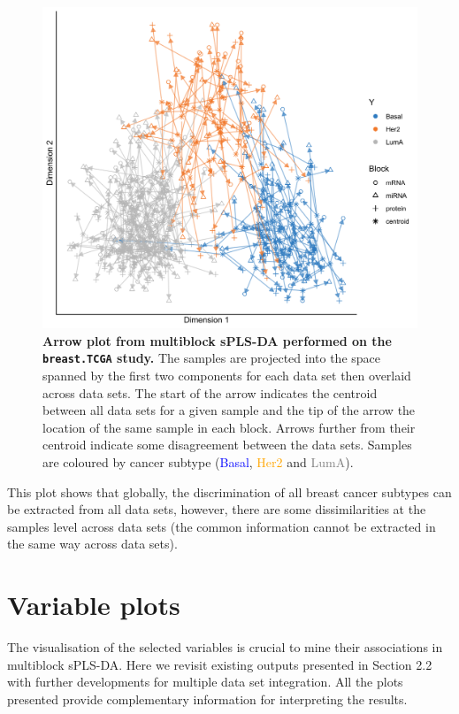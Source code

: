 \documentclass[]{book}
\begin{document}
\begin{figure}

{\centering \includegraphics[width=0.5\linewidth]{Figures/DIABLO/diablo-plotarrow-1} 

}

\caption{\textbf{Arrow plot from multiblock sPLS-DA
performed on the \texttt{breast.TCGA} study.} The samples are projected
into the space spanned by the first two components for each data set
then overlaid across data sets. The start of the arrow indicates the
centroid between all data sets for a given sample and the tip of the
arrow the location of the same sample in each block. Arrows further from
their centroid indicate some disagreement between the data sets. Samples
are coloured by cancer subtype (\textcolor{blue}{Basal},
\textcolor{orange}{Her2} and \textcolor{grey}{LumA}).}\label{fig:diablo-plotarrow}
\end{figure}











This plot shows that globally, the discrimination of all breast cancer
subtypes can be extracted from all data sets, however, there are some
dissimilarities at the samples level across data sets (the common
information cannot be extracted in the same way across data sets).

\section{Variable plots}\label{diablo:result:varplot}

The visualisation of the selected variables is crucial to mine their
associations in multiblock sPLS-DA. Here we revisit existing outputs
presented in Section 2.2 with further developments for multiple data set
integration. All the plots presented provide complementary information
for interpreting the results.
\end{document}
